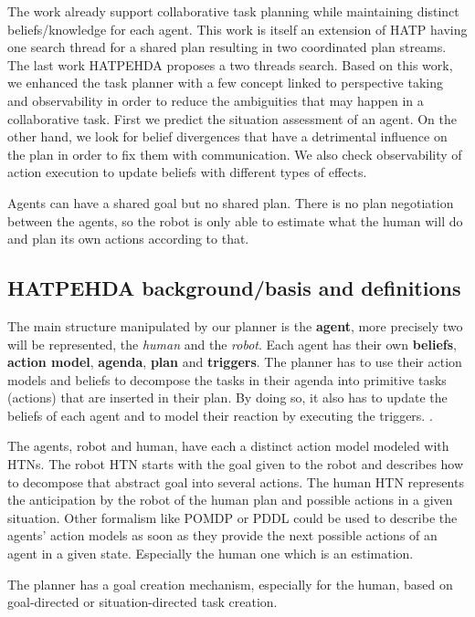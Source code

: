 \documentclass[letterpaper]{article} %
\begin{document}
The work \cite{buisan:hal-03684211} already support collaborative task planning while maintaining distinct beliefs/knowledge for each agent. This work is itself an extension of HATP \cite{hatp?} having one search thread for a shared plan resulting in two coordinated plan streams. The last work HATPEHDA proposes a two threads search. Based on this work, we enhanced the task planner with a few concept linked to perspective taking and observability in order to reduce the ambiguities that may happen in a collaborative task. First we predict the situation assessment of an agent. On the other hand, we look for belief divergences that have a detrimental influence on the plan in order to fix them with communication. We also check observability of action execution to update beliefs with different types of effects.

Agents can have a shared goal but no shared plan. There is no plan negotiation between the agents, so the robot is only able to estimate what the human will do and plan its own actions according to that.

\subsection{HATPEHDA background/basis and definitions}

The main structure manipulated by our planner is the \textbf{agent}, more precisely two will be represented, the \textit{human} and the \textit{robot}. Each agent has their own \textbf{beliefs}, \textbf{action model}, \textbf{agenda}, \textbf{plan} and \textbf{triggers}. The planner has to use their action models and beliefs to decompose the tasks in their agenda into primitive tasks (actions) that are inserted in their plan. By doing so, it also has to update the beliefs of each agent and to model their reaction by executing the triggers. \cite{buisan:hal-03684211}.

The agents, robot and human, have each a distinct action model modeled with HTNs. The robot HTN starts with the goal given to the robot and describes how to decompose that abstract goal into several actions. The human HTN represents the anticipation by the robot of the human plan and possible actions in a given situation. Other formalism like POMDP or PDDL could be used to describe the agents' action models as soon as they provide the next possible actions of an agent in a given state. Especially the human one which is an estimation.

The planner has a goal creation mechanism, especially for the human, based on goal-directed or situation-directed task creation.
\end{document}
